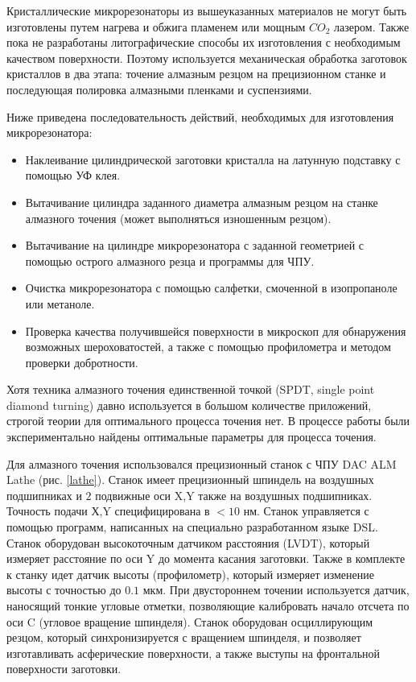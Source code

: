 Кристаллические микрорезонаторы из вышеуказанных материалов не могут быть изготовлены путем нагрева и обжига пламенем или мощным $CO_2$ лазером. Также пока не разработаны литографические способы их изготовления с необходимым качеством поверхности. Поэтому используется механическая обработка заготовок кристаллов в два этапа: точение алмазным резцом на прецизионном станке и последующая полировка алмазными пленками и суспензиями.

Ниже приведена последовательность действий, необходимых для изготовления микрорезонатора:

\begin{itemize}
  \item Наклеивание цилиндрической заготовки кристалла на латунную подставку с помощью УФ клея.
  \item Вытачивание цилиндра заданного диаметра алмазным резцом на станке алмазного точения (может выполняться изношенным резцом).
  \item Вытачивание на цилиндре микрорезонатора с заданной геометрией с помощью острого алмазного резца и программы для ЧПУ.
  \item Очистка микрорезонатора с помощью салфетки, смоченной в изопропаноле или метаноле.
  \item Проверка качества получившейся поверхности в микроскоп для обнаружения возможных шероховатостей, а также с помощью профилометра и методом проверки добротности.
\end{itemize}

Хотя техника алмазного точения единственной точкой (SPDT, single point diamond turning) давно используется в большом количестве приложений, строгой теории для оптимального процесса точения нет. В процессе работы были экспериментально найдены оптимальные параметры для процесса точения.

Для алмазного точения использовался прецизионный станок с ЧПУ DAC ALM Lathe (рис. \ref{lathe}). Станок имеет прецизионный шпиндель на воздушных подшипниках и $2$ подвижные оси X,Y также на воздушных подшипниках. Точность подачи Х,Y специфицирована в $<10$ нм. Станок управляется с помощью программ, написанных на специально разработанном языке DSL. Станок оборудован высокоточным датчиком расстояния (LVDT), который измеряет расстояние по оси Y до момента касания заготовки. Также в комплекте к станку идет датчик высоты (профилометр), который измеряет изменение высоты с точностью до $0.1$ мкм. При двустороннем точении используется датчик, наносящий тонкие угловые отметки, позволяющие калибровать начало отсчета по оси C (угловое вращение шпинделя). Станок оборудован осциллирующим резцом, который синхронизируется с вращением шпинделя, и позволяет изготавливать асферические поверхности, а также выступы на фронтальной поверхности заготовки.

